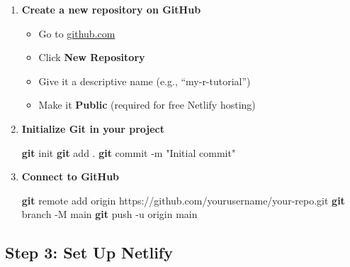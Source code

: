 \documentclass[
]{book}
\newenvironment{Shaded}{\begin{snugshade}}{\end{snugshade}}
\newcommand{\AttributeTok}[1]{\textcolor[rgb]{0.13,0.29,0.53}{#1}}
\newcommand{\FunctionTok}[1]{\textcolor[rgb]{0.13,0.29,0.53}{\textbf{#1}}}
\newcommand{\NormalTok}[1]{#1}
\newcommand{\StringTok}[1]{\textcolor[rgb]{0.31,0.60,0.02}{#1}}
\providecommand{\tightlist}{%
  \setlength{\itemsep}{0pt}\setlength{\parskip}{0pt}}
\begin{document}
\begin{enumerate}
\def\labelenumi{\arabic{enumi}.}
\item
  \textbf{Create a new repository on GitHub}

  \begin{itemize}
  \tightlist
  \item
    Go to \href{https://github.com}{github.com}
  \item
    Click \textbf{New Repository}
  \item
    Give it a descriptive name (e.g., ``my-r-tutorial'')
  \item
    Make it \textbf{Public} (required for free Netlify hosting)
  \end{itemize}
\item
  \textbf{Initialize Git in your project}

\begin{Shaded}
\begin{Highlighting}[]
\FunctionTok{git}\NormalTok{ init}
\FunctionTok{git}\NormalTok{ add .}
\FunctionTok{git}\NormalTok{ commit }\AttributeTok{{-}m} \StringTok{"Initial commit"}
\end{Highlighting}
\end{Shaded}
\item
  \textbf{Connect to GitHub}

\begin{Shaded}
\begin{Highlighting}[]
\FunctionTok{git}\NormalTok{ remote add origin https://github.com/yourusername/your{-}repo.git}
\FunctionTok{git}\NormalTok{ branch }\AttributeTok{{-}M}\NormalTok{ main}
\FunctionTok{git}\NormalTok{ push }\AttributeTok{{-}u}\NormalTok{ origin main}
\end{Highlighting}
\end{Shaded}
\end{enumerate}

\subsection{Step 3: Set Up Netlify}\label{step-3-set-up-netlify}
\end{document}

